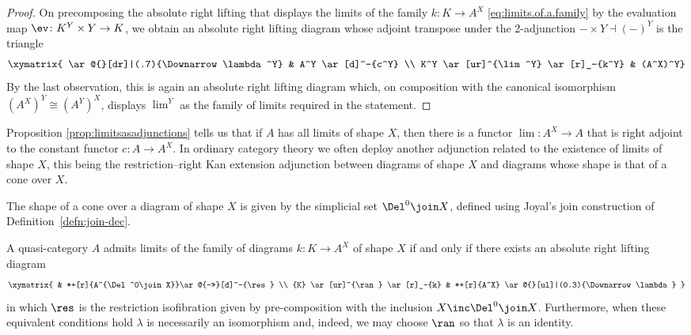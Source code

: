 \begin{proof}
  On precomposing the absolute right lifting that displays the limits of the family $k\colon K\to A^X$ \eqref{eq:limits.of.a.family} by the evaluation map $\ev\colon K^Y\times Y\to K$, we obtain an absolute right lifting diagram whose adjoint transpose under the 2-adjunction ${-}\times Y\dashv (-)^Y$ is the triangle
  \begin{equation*}
      \xymatrix{ \ar@{}[dr]|(.7){\Downarrow\lambda^Y} & A^Y \ar[d]^-{c^Y} \\ K^Y \ar[ur]^{\lim^Y} \ar[r]_-{k^Y} & (A^X)^Y}
\end{equation*}
  By the last observation, this is again an absolute right lifting diagram which, on composition with the canonical isomorphism $(A^X)^Y\cong(A^Y)^X$, displays $\lim^Y$ as the family of limits required in the statement.
\end{proof}

Proposition \ref{prop:limitsasadjunctions} tells us that if $A$ has all limits of shape $X$, then there is a functor $\lim \colon A^X \to A$ that is right adjoint to the constant functor $c \colon A \to A^X$. In ordinary category theory we often deploy another adjunction related to the existence of limits of shape $X$, this being the restriction--right Kan extension adjunction between diagrams of shape $X$ and diagrams whose shape is that of a cone over $X$.

The shape of a cone over a diagram of shape $X$ is given by the simplicial set $\Del^0\join X$, defined using Joyal's join construction of Definition~\ref{defn:join-dec}.

\begin{prop}\label{prop:ran.adj.limits} A quasi-category $A$ admits limits of the family of diagrams $k\colon K\to A^X$ of shape $X$ if and only if there exists an absolute right lifting diagram
\begin{equation*}
  \xymatrix{
    & *+[r]{A^{\Del^0\join X}}\ar@{->>}[d]^-{\res} \\
    {K} \ar[ur]^{\ran} \ar[r]_-{k} 
    & *+[r]{A^X} \ar@{}[ul]|(0.3){\Downarrow\lambda}
  }
\end{equation*}
in which  $\res$  is the restriction isofibration given by pre-composition with the inclusion $X\inc \Del^0\join X$. Furthermore, when these equivalent conditions hold $\lambda$ is necessarily an isomorphism and, indeed, we may choose $\ran$ so that $\lambda$ is an identity.
\end{prop}


